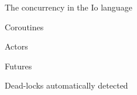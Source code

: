 \begin{frame}
  \begin{center}
    The concurrency in the Io language
  \end{center}
\end{frame}

\begin{frame}
  \begin{center}
    Coroutines
  \end{center}
\end{frame}

\begin{frame}
  \begin{center}
    Actors
  \end{center}
\end{frame}

\begin{frame}
  \begin{center}
    Futures
  \end{center}
\end{frame}

\begin{frame}
  \begin{center}
    Dead-locks automatically detected
  \end{center}
\end{frame}
